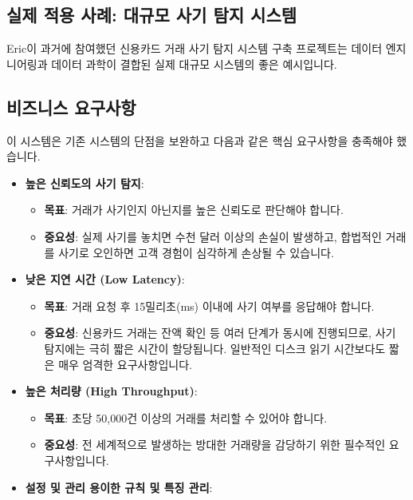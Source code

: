 \documentclass[11pt,a4paper]{article}
\theoremstyle{definition}
\begin{document}
\begin{itemize}
\begin{itemize}
\begin{itemize}
\begin{itemize}
\newpage
\section*{실제 적용 사례: 대규모 사기 탐지 시스템}

Eric이 과거에 참여했던 신용카드 거래 사기 탐지 시스템 구축 프로젝트는 데이터 엔지니어링과 데이터 과학이 결합된 실제 대규모 시스템의 좋은 예시입니다.

\subsection*{비즈니스 요구사항}

이 시스템은 기존 시스템의 단점을 보완하고 다음과 같은 핵심 요구사항을 충족해야 했습니다.

\begin{itemize}
    \item \textbf{높은 신뢰도의 사기 탐지}:
    \begin{itemize}
        \item \textbf{목표}: 거래가 사기인지 아닌지를 높은 신뢰도로 판단해야 합니다.
        \item \textbf{중요성}: 실제 사기를 놓치면 수천 달러 이상의 손실이 발생하고, 합법적인 거래를 사기로 오인하면 고객 경험이 심각하게 손상될 수 있습니다.
    \end{itemize}
    \item \textbf{낮은 지연 시간 (Low Latency)}:
    \begin{itemize}
        \item \textbf{목표}: 거래 요청 후 15밀리초(ms) 이내에 사기 여부를 응답해야 합니다.
        \item \textbf{중요성}: 신용카드 거래는 잔액 확인 등 여러 단계가 동시에 진행되므로, 사기 탐지에는 극히 짧은 시간이 할당됩니다. 일반적인 디스크 읽기 시간보다도 짧은 매우 엄격한 요구사항입니다.
    \end{itemize}
    \item \textbf{높은 처리량 (High Throughput)}:
    \begin{itemize}
        \item \textbf{목표}: 초당 50,000건 이상의 거래를 처리할 수 있어야 합니다.
        \item \textbf{중요성}: 전 세계적으로 발생하는 방대한 거래량을 감당하기 위한 필수적인 요구사항입니다.
    \end{itemize}
    \item \textbf{설정 및 관리 용이한 규칙 및 특징 관리}:
    \begin{itemize}

\end{itemize}
\end{itemize}
\end{itemize}
\end{itemize}
\end{itemize}
\end{itemize}
\end{document}
